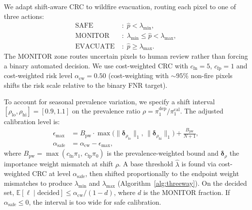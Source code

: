 \documentclass{article}
\begin{document}
We adapt shift-aware CRC to wildfire evacuation, routing each pixel to one of three actions:
\begin{equation}
    \begin{aligned}
        \text{SAFE} \;     & :\; \hat{p} < \lambda_{\min},                    \\
        \text{MONITOR} \;  & :\; \lambda_{\min} \le \hat{p} < \lambda_{\max}, \\
        \text{EVACUATE} \; & :\; \hat{p} \ge \lambda_{\max}.
    \end{aligned}
\end{equation}
The MONITOR zone routes uncertain pixels to human review rather than forcing a binary automated decision.
We use cost-weighted CRC with $c_{\mathrm{fn}}{=}5$, $c_{\mathrm{fp}}{=}1$ \citep{zhao2022evacuation} and cost-weighted risk level $\alpha_{\mathrm{cw}}{=}0.50$ (cost-weighting with ${\sim}95\%$ non-fire pixels shifts the risk scale relative to the binary FNR target).

To account for seasonal prevalence variation, we specify a shift interval $[\rho_{\mathrm{lo}}, \rho_{\mathrm{hi}}] = [0.9, 1.1]$ on the prevalence ratio $\rho = \pi_1^{\mathrm{dep}} / \pi_1^{\mathrm{cal}}$.
The adjusted calibration level is:
\begin{align}
    \epsilon_{\max}        & = B_{\mathrm{pw}} \cdot \max\!\bigl(\lVert \boldsymbol{\delta}_{\rho_{\mathrm{lo}}} \rVert_1,\, \lVert \boldsymbol{\delta}_{\rho_{\mathrm{hi}}} \rVert_1\bigr) + \tfrac{B_{\mathrm{pw}}}{N{+}1}, \label{eq:eps-max} \\
    \alpha_{\mathrm{safe}} & = \alpha_{\mathrm{cw}} - \epsilon_{\max}, \label{eq:alpha-safe}
\end{align}
where $B_{\mathrm{pw}} = \max(c_{\mathrm{fn}} \pi_1,\, c_{\mathrm{fp}} \pi_0)$ is the prevalence-weighted bound and $\boldsymbol{\delta}_\rho$ the importance weight mismatch at shift $\rho$.
A base threshold $\hat{\lambda}$ is found via cost-weighted CRC at level $\alpha_{\mathrm{safe}}$, then shifted proportionally to the endpoint weight mismatches to produce $\lambda_{\min}$ and $\lambda_{\max}$ (Algorithm~\ref{alg:threeway}).
On the decided set, $\mathbb{E}[\ell \mid \mathrm{decided}] \le \alpha_{\mathrm{cw}} / (1 - d)$, where $d$ is the MONITOR fraction.
If $\alpha_{\mathrm{safe}} \le 0$, the interval is too wide for safe calibration.

\end{document}

